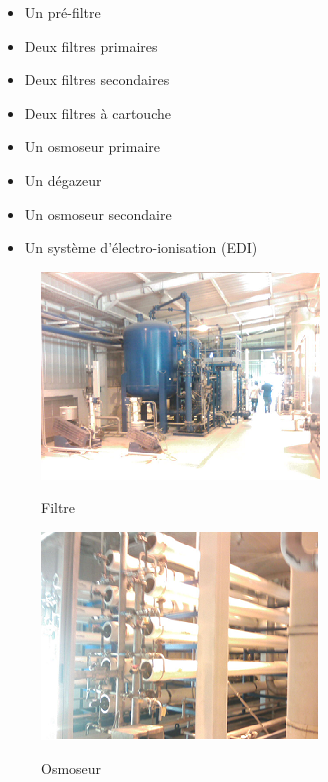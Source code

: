 \begin{itemize}
\item Un pré-filtre
\item	Deux filtres primaires
\item	Deux filtres secondaires
\item Deux filtres à cartouche
\item Un osmoseur  primaire
\item	Un dégazeur
\item Un osmoseur secondaire 
\item	Un système d'électro-ionisation (EDI)
\end{itemize}	
\begin{figure}

  \begin{minipage}[t]{7cm}
        \centering
	\includegraphics[scale=0.9]{./Figures/filtre.png}
		\label{fig:filtre}
		\caption{Filtre}
    \end{minipage}
    \begin{minipage}[t]{8cm}
        \centering
\includegraphics[scale=0.9]{./Figures/osmoseur.png}

	\label{fig:osmoseur}
			\caption{Osmoseur}

    \end{minipage}
\end{figure}

